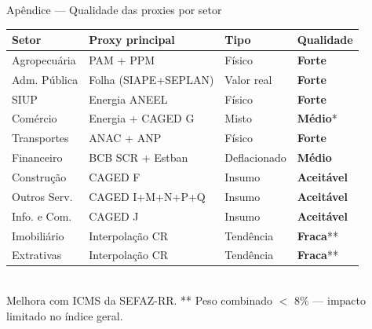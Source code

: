 \documentclass[aspectratio=169, 11pt]{beamer}
\begin{document}
\begin{frame}{Apêndice — Qualidade das proxies por setor}
  \small
  \renewcommand{\arraystretch}{1.2}
  \begin{tabular}{>{\raggedright}p{3.5cm} >{\raggedright}p{2.2cm} >{\raggedright}p{2.0cm} l}
    \toprule
    \textbf{Setor} & \textbf{Proxy principal} & \textbf{Tipo} & \textbf{Qualidade} \\
    \midrule
    Agropecuária & PAM + PPM & Físico & \color{seplangreen}\textbf{Forte} \\
    Adm. Pública & Folha (SIAPE+SEPLAN) & Valor real & \color{seplangreen}\textbf{Forte} \\
    SIUP & Energia ANEEL & Físico & \color{seplangreen}\textbf{Forte} \\
    Comércio & Energia + CAGED G & Misto & \color{seplangold}\textbf{Médio}* \\
    Transportes & ANAC + ANP & Físico & \color{seplangreen}\textbf{Forte} \\
    Financeiro & BCB SCR + Estban & Deflacionado & \color{seplangold}\textbf{Médio} \\
    Construção & CAGED F & Insumo & \color{seplangold}\textbf{Aceitável} \\
    Outros Serv. & CAGED I+M+N+P+Q & Insumo & \color{seplangold}\textbf{Aceitável} \\
    Info. e Com. & CAGED J & Insumo & \color{seplangold}\textbf{Aceitável} \\
    Imobiliário & Interpolação CR & Tendência & \color{seplanred}\textbf{Fraca}** \\
    Extrativas & Interpolação CR & Tendência & \color{seplanred}\textbf{Fraca}** \\
    \bottomrule
  \end{tabular}\\[4pt]
  {\tiny * Melhora com ICMS da SEFAZ-RR.
   ** Peso combinado $<$ 8\% — impacto limitado no índice geral.}
\end{frame}
\end{document}
